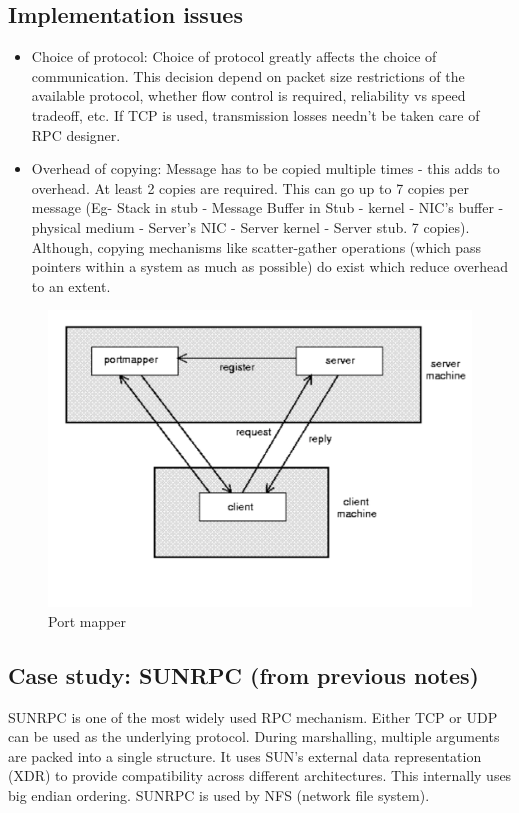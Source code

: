 \documentclass[twoside]{article}
\begin{document}
\subsection{Implementation issues}
\begin{itemize}
  \item {Choice of protocol}: Choice of protocol greatly affects the choice of communication. This decision depend on packet size restrictions of the available protocol, whether flow control is required, reliability vs speed tradeoff, etc. If TCP is used, transmission losses needn't be taken care of RPC designer.
  \item {Overhead of copying}: Message has to be copied multiple times - this adds to overhead. At least 2 copies are required. This can go up to 7 copies per message (Eg- Stack in stub - Message Buffer in Stub - kernel - NIC's buffer - physical medium - Server's NIC - Server kernel - Server stub. 7 copies). Although, copying mechanisms like scatter-gather operations (which pass pointers within a system as much as possible) do exist which reduce overhead to an extent.
\end{itemize}

\begin{figure}[h]
\centering
\includegraphics[scale=0.5]{port_mapper.png}
\caption{Port mapper}
\end{figure}

\subsection{Case study: SUNRPC (from previous notes)}
SUNRPC is one of the most widely used RPC mechanism. Either TCP or UDP can be used as the underlying protocol. During marshalling, multiple arguments are packed into a single structure. It uses SUN's external data representation (XDR) to provide compatibility across different architectures. This internally uses big endian ordering. SUNRPC is used by NFS (network file system).
\end{document}
